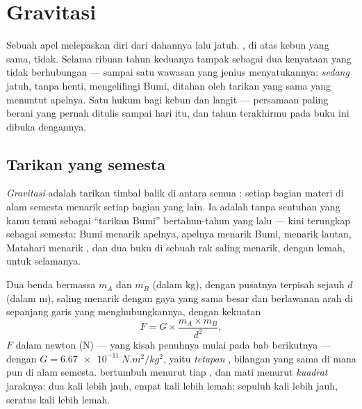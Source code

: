 \chapter{Gravitasi}\label{ch:g9:gravitation}

Sebuah apel melepaskan diri dari dahannya lalu jatuh. , di atas
kebun yang sama, tidak. Selama ribuan tahun keduanya tampak sebagai
dua kenyataan yang tidak berhubungan --- sampai satu wawasan yang
jenius menyatukannya:  \emph{sedang} jatuh, tanpa henti,
mengelilingi Bumi, ditahan oleh tarikan yang sama yang menuntut
apelnya. Satu hukum bagi kebun dan langit --- persamaan paling berani
yang pernah ditulis sampai hari itu, dan tahun terakhirmu pada buku
ini dibuka dengannya.

\section{Tarikan yang semesta}

\begin{definition}[Gravitasi]\label{def:g9:gravitation:gravitation}
\emph{Gravitasi} adalah tarikan timbal balik di
antara semua : setiap bagian materi di alam semesta menarik
setiap bagian yang lain. Ia adalah  tanpa sentuhan yang kamu temui
sebagai ``tarikan Bumi'' bertahun-tahun yang lalu --- kini terungkap
sebagai semesta: Bumi menarik apelnya, apelnya menarik Bumi, 
menarik lautan, Matahari menarik , dan dua buku di sebuah rak
saling menarik, dengan lemah, untuk selamanya.
\end{definition}

\begin{proposition}\label{prop:g9:gravitation:law}
Dua benda bermassa $m_A$ dan $m_B$ (dalam \unit{kg}), dengan pusatnya
terpisah sejauh $d$ (dalam \unit{m}), saling menarik dengan gaya yang
sama besar dan berlawanan arah di sepanjang garis yang
menghubungkannya, dengan kekuatan
\[
F = G \times \frac{m_A \times m_B}{d^2},
\]
$F$ dalam newton (\unit{N}) ---   yang kisah penuhnya mulai
pada bab berikutnya --- dengan
$G = \qty{6.67e-11}{N.m^2/kg^2}$, yaitu \emph{tetapan },
bilangan yang sama di mana pun di alam semesta.  bertumbuh
menurut tiap , dan mati menurut \emph{kuadrat} jaraknya: dua
kali lebih jauh, empat kali lebih lemah; sepuluh kali lebih jauh,
seratus kali lebih lemah.
\end{proposition}

